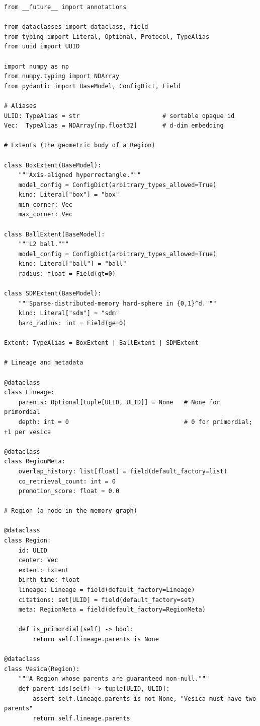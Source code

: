 \documentclass[11pt,a4paper]{article}
\begin{document}
\begin{lstlisting}
from __future__ import annotations

from dataclasses import dataclass, field
from typing import Literal, Optional, Protocol, TypeAlias
from uuid import UUID

import numpy as np
from numpy.typing import NDArray
from pydantic import BaseModel, ConfigDict, Field

# Aliases
ULID: TypeAlias = str                       # sortable opaque id
Vec:  TypeAlias = NDArray[np.float32]       # d-dim embedding

# Extents (the geometric body of a Region)

class BoxExtent(BaseModel):
    """Axis-aligned hyperrectangle."""
    model_config = ConfigDict(arbitrary_types_allowed=True)
    kind: Literal["box"] = "box"
    min_corner: Vec
    max_corner: Vec

class BallExtent(BaseModel):
    """L2 ball."""
    model_config = ConfigDict(arbitrary_types_allowed=True)
    kind: Literal["ball"] = "ball"
    radius: float = Field(gt=0)

class SDMExtent(BaseModel):
    """Sparse-distributed-memory hard-sphere in {0,1}^d."""
    kind: Literal["sdm"] = "sdm"
    hard_radius: int = Field(ge=0)

Extent: TypeAlias = BoxExtent | BallExtent | SDMExtent

# Lineage and metadata

@dataclass
class Lineage:
    parents: Optional[tuple[ULID, ULID]] = None   # None for primordial
    depth: int = 0                                # 0 for primordial; +1 per vesica

@dataclass
class RegionMeta:
    overlap_history: list[float] = field(default_factory=list)
    co_retrieval_count: int = 0
    promotion_score: float = 0.0

# Region (a node in the memory graph)

@dataclass
class Region:
    id: ULID
    center: Vec
    extent: Extent
    birth_time: float
    lineage: Lineage = field(default_factory=Lineage)
    citations: set[ULID] = field(default_factory=set)
    meta: RegionMeta = field(default_factory=RegionMeta)

    def is_primordial(self) -> bool:
        return self.lineage.parents is None

@dataclass
class Vesica(Region):
    """A Region whose parents are guaranteed non-null."""
    def parent_ids(self) -> tuple[ULID, ULID]:
        assert self.lineage.parents is not None, "Vesica must have two parents"
        return self.lineage.parents


\end{lstlisting}
\end{document}
